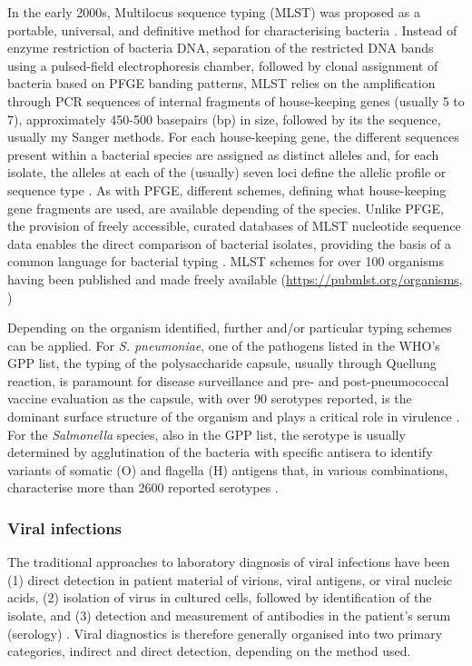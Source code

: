 In the early 2000s, Multilocus sequence typing (MLST) was proposed as a portable, universal, and definitive method for characterising bacteria \citep{maiden_multilocus_2006}. Instead of enzyme restriction of bacteria DNA, separation of the restricted DNA bands using a pulsed-field electrophoresis chamber, followed by clonal assignment of bacteria based on PFGE banding patterns, MLST relies on the amplification through PCR sequences of internal fragments of house-keeping genes (usually 5 to 7), approximately 450-500 basepairs (bp) in size, followed by its the sequence, usually my Sanger methods. For each house-keeping gene, the different sequences present within a bacterial species are assigned as distinct alleles and, for each isolate, the alleles at each of the (usually) seven loci define the allelic profile or sequence type \citep{larsen_multilocus_2012}. As with PFGE, different schemes, defining what house-keeping gene fragments are used, are available depending of the species. Unlike PFGE, the provision of freely accessible, curated databases of MLST nucleotide sequence data enables the direct comparison of bacterial isolates, providing the basis of a common language for bacterial typing \citep{maiden_multilocus_2006}. MLST schemes for over 100 organisms having been published and made freely available (\url{https://pubmlst.org/organisms}, \cite{jolley_open-access_2018}) 


Depending on the organism identified, further and/or particular typing schemes can be applied. For \textit{S. pneumoniae}, one of the pathogens listed in the WHO's GPP list, the typing of the polysaccharide capsule, usually through Quellung reaction, is paramount for disease surveillance and pre- and post-pneumococcal vaccine evaluation as the capsule, with over 90 serotypes reported, is the dominant surface structure of the organism and plays a critical role in virulence \citep{jauneikaite_current_2015, paton_streptococcus_2019}. For the \textit{Salmonella} species, also in the GPP list, the serotype is usually determined by agglutination of the bacteria with specific antisera to identify variants of somatic (O) and flagella (H) antigens that, in various combinations, characterise more than 2600 reported serotypes \citep{diep_salmonella_2019}. 

\subsubsection{Viral infections}

The traditional approaches to laboratory diagnosis of viral infections have been (1) direct detection in patient material of virions, viral antigens, or viral nucleic acids, (2) isolation of virus in cultured cells, followed by identification of the isolate, and (3) detection and measurement of antibodies in the patient’s serum (serology) \citep{burrell_laboratory_2017}. Viral diagnostics is therefore generally organised into two primary categories, indirect and direct detection, depending on the method used. 


